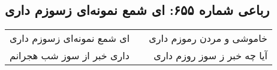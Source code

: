 \begin{center}
\section*{رباعی شماره ۶۵۵: ای شمع نمونه‌ای زسوزم داری}
\label{sec:sh655}
\begin{longtable}{l p{0.5cm} r}
ای شمع نمونه‌ای زسوزم داری
&&
خاموشی و مردن رموزم داری
\\
داری خبر از سوز شب هجرانم
&&
آیا چه خبر ز سوز روزم داری
\\
\end{longtable}
\end{center}
